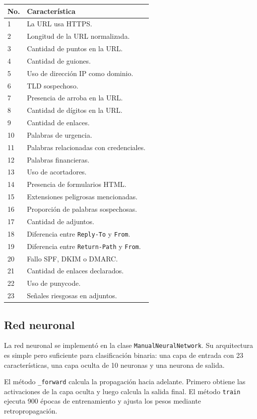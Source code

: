 \documentclass[12pt,letterpaper]{article}
\begin{document}
\begin{longtable}{p{1cm}p{12cm}}
\toprule
\textbf{No.} & \textbf{Característica} \\
\midrule
1 & La URL usa HTTPS. \\
2 & Longitud de la URL normalizada. \\
3 & Cantidad de puntos en la URL. \\
4 & Cantidad de guiones. \\
5 & Uso de dirección IP como dominio. \\
6 & TLD sospechoso. \\
7 & Presencia de arroba en la URL. \\
8 & Cantidad de dígitos en la URL. \\
9 & Cantidad de enlaces. \\
10 & Palabras de urgencia. \\
11 & Palabras relacionadas con credenciales. \\
12 & Palabras financieras. \\
13 & Uso de acortadores. \\
14 & Presencia de formularios HTML. \\
15 & Extensiones peligrosas mencionadas. \\
16 & Proporción de palabras sospechosas. \\
17 & Cantidad de adjuntos. \\
18 & Diferencia entre \texttt{Reply-To} y \texttt{From}. \\
19 & Diferencia entre \texttt{Return-Path} y \texttt{From}. \\
20 & Fallo SPF, DKIM o DMARC. \\
21 & Cantidad de enlaces declarados. \\
22 & Uso de punycode. \\
23 & Señales riesgosas en adjuntos. \\
\bottomrule
\end{longtable}

\subsection{Red neuronal}

La red neuronal se implementó en la clase \texttt{ManualNeuralNetwork}. Su arquitectura es simple pero suficiente para clasificación binaria: una capa de entrada con 23 características, una capa oculta de 10 neuronas y una neurona de salida.

El método \texttt{\_forward} calcula la propagación hacia adelante. Primero obtiene las activaciones de la capa oculta y luego calcula la salida final. El método \texttt{train} ejecuta 900 épocas de entrenamiento y ajusta los pesos mediante retropropagación.
\end{document}
